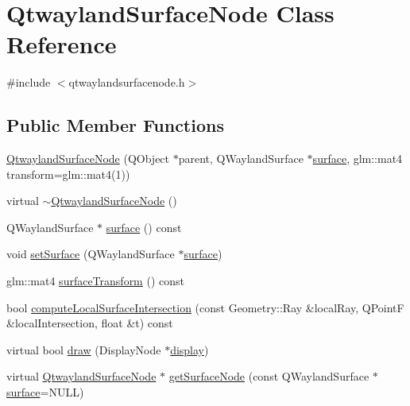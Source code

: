 \hypertarget{classQtwaylandSurfaceNode}{\section{Qtwayland\-Surface\-Node Class Reference}
\label{classQtwaylandSurfaceNode}
}


{\ttfamily \#include $<$qtwaylandsurfacenode.\-h$>$}

\subsection*{Public Member Functions}
\begin{DoxyCompactItemize}
\item 
\hyperlink{classQtwaylandSurfaceNode_a582fc9fb7bee6fecc1935c229bc84e72}{Qtwayland\-Surface\-Node} (Q\-Object $\ast$parent, Q\-Wayland\-Surface $\ast$\hyperlink{simple-egl_8c_a0720952aa1caded45b5bcdce589663a9}{surface}, glm\-::mat4 transform=glm\-::mat4(1))
\item 
virtual \hyperlink{classQtwaylandSurfaceNode_af762332b319b9239e955d4a69b165c14}{$\sim$\-Qtwayland\-Surface\-Node} ()
\item 
Q\-Wayland\-Surface $\ast$ \hyperlink{classQtwaylandSurfaceNode_a8f07c78202a2faa244d9d6c389c03951}{surface} () const 
\item 
void \hyperlink{classQtwaylandSurfaceNode_ace08a2691d01fe10087e9b6997d1523b}{set\-Surface} (Q\-Wayland\-Surface $\ast$\hyperlink{simple-egl_8c_a0720952aa1caded45b5bcdce589663a9}{surface})
\item 
glm\-::mat4 \hyperlink{classQtwaylandSurfaceNode_a8f88e9c392012d312206da67d6ea81ed}{surface\-Transform} () const 
\item 
bool \hyperlink{classQtwaylandSurfaceNode_a0307e078cfa9bcd6aaad60830ab5b3a6}{compute\-Local\-Surface\-Intersection} (const Geometry\-::\-Ray \&local\-Ray, Q\-Point\-F \&local\-Intersection, float \&t) const 
\item 
virtual bool \hyperlink{classQtwaylandSurfaceNode_a620c58196d857fe5146cfff49c6787fd}{draw} (Display\-Node $\ast$\hyperlink{structdisplay}{display})
\item 
virtual \hyperlink{classQtwaylandSurfaceNode}{Qtwayland\-Surface\-Node} $\ast$ \hyperlink{classQtwaylandSurfaceNode_a72db2bcd85e26d7f0332175f691a0dfd}{get\-Surface\-Node} (const Q\-Wayland\-Surface $\ast$\hyperlink{simple-egl_8c_a0720952aa1caded45b5bcdce589663a9}{surface}=N\-U\-L\-L)
\item 

\end{DoxyCompactItemize}

